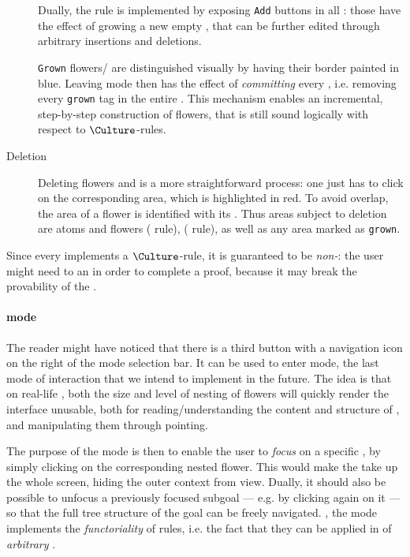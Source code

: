 \begin{scope}
\begin{description}
  Dually, the  rule is implemented by exposing \texttt{Add} buttons in
  all  : those have the effect of growing a new empty ,
  that can be further edited through arbitrary insertions and deletions.

  \texttt{Grown} flowers/ are distinguished visually by having their
  border painted in blue. Leaving  mode then has the effect of
  \emph{committing} every  , i.e. removing every \texttt{grown}
  tag in the entire . This mechanism enables an incremental,
  step-by-step construction of flowers, that is still sound logically with
  respect to $\Culture$-rules.

  \item[Deletion] Deleting flowers and  is a more straightforward
  process: one just has to click on the corresponding area, which is highlighted
  in red. To avoid overlap, the area of a flower is identified with its
  . Thus areas subject to deletion are  atoms and
  flowers ( rule),   ( rule), as well
  as any area marked as \texttt{grown}.
\end{description}

Since every   implements a $\Culture$-rule, it is guaranteed to be
\emph{non-}: the user might need to  an   in order to
complete a proof, because it may break the provability of the .

\paragraph{ mode}

The reader might have noticed that there is a third button with a navigation
icon on the right of the mode selection bar. It can be used to enter
 mode, the last mode of interaction that we intend to implement
in the future. The idea is that on real-life , both the size and level
of nesting of flowers will quickly render the interface unusable, both for
reading/understanding the content and structure of , and manipulating
them through pointing.

The purpose of the  mode is then to enable the user to
\emph{focus} on a specific , by simply clicking on the corresponding
nested flower. This would make the  take up the whole screen, hiding
the outer context from view. Dually, it should also be possible to unfocus a
previously focused subgoal --- e.g. by clicking again on it --- so that the full
tree structure of the goal can be freely navigated. ,
the  mode implements the \emph{functoriality} of rules, i.e. the
fact that they can be applied in  of \emph{arbitrary} .


\end{scope}
